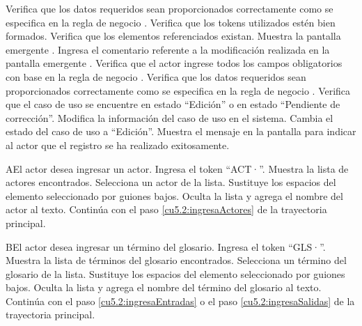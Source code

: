 \begin{UCtrayectoria}
    \UCpaso[\UCsist] Verifica que los datos requeridos sean proporcionados correctamente como se especifica en la regla de negocio .  
    \UCpaso[\UCsist] Verifica que los tokens utilizados estén bien formados. 
    \UCpaso[\UCsist] Verifica que los elementos referenciados existan. 
	\UCpaso[\UCsist] Muestra la pantalla emergente .
	\UCpaso[\UCsist] Ingresa el comentario referente a la modificación realizada en la pantalla emergente . \label{cu5.2:ingresaComentario}
    \UCpaso[\UCsist] Verifica que el actor ingrese todos los campos obligatorios con base en la regla de negocio  . 
    \UCpaso[\UCsist] Verifica que los datos requeridos sean proporcionados correctamente como se especifica en la regla de negocio . 
	\UCpaso[\UCsist] Verifica que el caso de uso se encuentre en estado ``Edición'' o en estado ``Pendiente de corrección''.
	\UCpaso[\UCsist] Modifica la información del caso de uso en el sistema.
    \UCpaso[\UCsist] Cambia el estado del caso de uso a ``Edición''.
    \UCpaso[\UCsist] Muestra el mensaje  en la pantalla  
    para indicar al actor que el registro se ha realizado exitosamente.
 \end{UCtrayectoria}
 
 \begin{UCtrayectoriaA}{A}{El actor desea ingresar un actor.}
 	\UCpaso[\UCactor] Ingresa el token ``ACT·''.
 	\UCpaso[\UCsist] Muestra la lista de actores encontrados.
 	\UCpaso[\UCactor] Selecciona un actor de la lista.
 	\UCpaso[\UCsist] Sustituye los espacios del elemento seleccionado por guiones bajos.
  	\UCpaso[\UCsist] Oculta la lista y agrega el nombre del actor al texto.
    \UCpaso[] Continúa con el paso \ref{cu5.2:ingresaActores} de la trayectoria principal.
 \end{UCtrayectoriaA}
 \begin{UCtrayectoriaA}{B}{El actor desea ingresar un término del glosario.}
 	\UCpaso[\UCactor] Ingresa el token ``GLS·''.	
 	\UCpaso[\UCsist] Muestra la lista de términos del glosario encontrados.
 	\UCpaso[\UCactor] Selecciona un término del glosario de la lista.
 	\UCpaso[\UCsist] Sustituye los espacios del elemento seleccionado por guiones bajos.
  	\UCpaso[\UCsist] Oculta la lista y agrega el nombre del término del glosario al texto.
    \UCpaso[] Continúa con el paso \ref{cu5.2:ingresaEntradas} o el paso \ref{cu5.2:ingresaSalidas} de la trayectoria principal.
 \end{UCtrayectoriaA}

